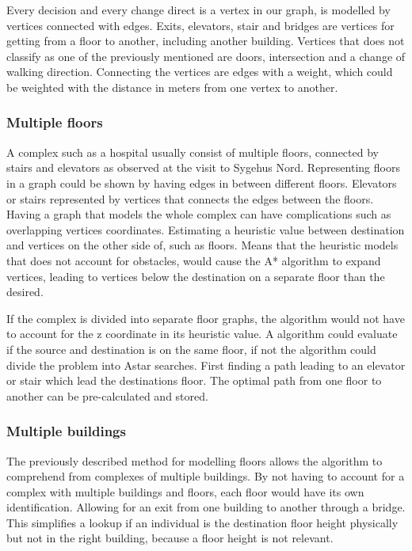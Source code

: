 Every decision and every change direct is a vertex in our graph, is modelled by vertices connected with edges. Exits, elevators, stair and bridges are vertices for getting from a floor to another, including another building. Vertices that does not classify as one of the previously mentioned are doors, intersection and a change of walking direction. Connecting the vertices are edges with a weight, which could be weighted with the distance in meters from one vertex to another.


\subsubsection{Multiple floors}

A complex such as a hospital usually consist of multiple floors, connected by stairs and elevators as observed at the visit to Sygehus Nord. Representing floors in a graph could be shown by having edges in between different floors. Elevators or stairs represented by vertices that connects the edges between the floors. Having a graph that models the whole complex can have complications such as overlapping vertices coordinates. Estimating a heuristic value between destination and vertices on the other side of, such as floors. Means that the heuristic models that does not account for obstacles, would cause the A* algorithm to expand vertices, leading to vertices below the destination on a separate floor than the desired.


If the complex is divided into separate floor graphs, the algorithm would not have to account for the z coordinate in its heuristic value. A algorithm could evaluate if the source and destination is on the same floor, if not the algorithm could divide the problem into Astar searches. First finding a path leading to an elevator or stair which lead the destinations floor. The optimal path from one floor to another can be pre-calculated and stored. 


\subsubsection{Multiple buildings}

The previously described method for modelling floors allows the algorithm to comprehend from complexes of multiple buildings. By not having to account for a complex with multiple buildings and floors, each floor would have its own identification. Allowing for an exit from one building to another through a bridge. This simplifies a lookup if an individual is the destination floor height physically but not in the right building, because a floor height is not relevant.
